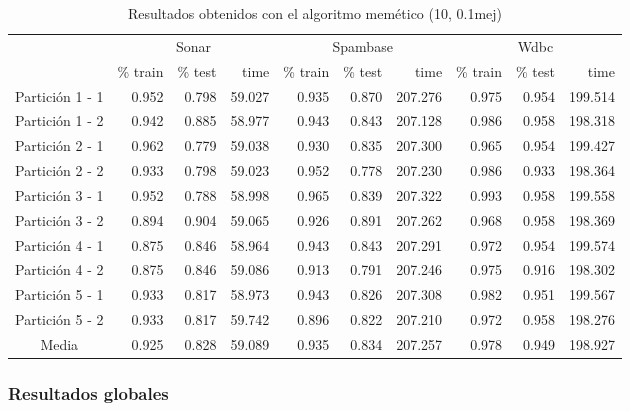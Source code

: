 \documentclass[11pt]{article}
\theoremstyle{plain}
\theoremstyle{definition}
\begin{document}
\begin{table}[H]
\centering
\caption{Resultados obtenidos con el algoritmo memético (10, 0.1mej)}
\label{tbl-amc}
\begin{tabular}{@{}crrrrrrrrr@{}}
  \toprule
  & \multicolumn{3}{c}{Sonar} & \multicolumn{3}{c}{Spambase} & \multicolumn{3}{c}{Wdbc}  \\
  \cmidrule(r){2-10}
           & \% train & \% test & time & \% train   & \% test   & time & \% train & \% test & time \\
  \midrule
Partición 1 - 1   & 0.952 & 0.798 & 59.027 & 0.935 & 0.870 & 207.276 & 0.975 & 0.954 & 199.514 \\
Partición 1 - 2   & 0.942 & 0.885 & 58.977 & 0.943 & 0.843 & 207.128 & 0.986 & 0.958 & 198.318 \\
Partición 2 - 1   & 0.962 & 0.779 & 59.038 & 0.930 & 0.835 & 207.300 & 0.965 & 0.954 & 199.427 \\
Partición 2 - 2   & 0.933 & 0.798 & 59.023 & 0.952 & 0.778 & 207.230 & 0.986 & 0.933 & 198.364 \\
Partición 3 - 1   & 0.952 & 0.788 & 58.998 & 0.965 & 0.839 & 207.322 & 0.993 & 0.958 & 199.558 \\
Partición 3 - 2   & 0.894 & 0.904 & 59.065 & 0.926 & 0.891 & 207.262 & 0.968 & 0.958 & 198.369 \\
Partición 4 - 1   & 0.875 & 0.846 & 58.964 & 0.943 & 0.843 & 207.291 & 0.972 & 0.954 & 199.574 \\
Partición 4 - 2   & 0.875 & 0.846 & 59.086 & 0.913 & 0.791 & 207.246 & 0.975 & 0.916 & 198.302 \\
Partición 5 - 1   & 0.933 & 0.817 & 58.973 & 0.943 & 0.826 & 207.308 & 0.982 & 0.951 & 199.567 \\
Partición 5 - 2   & 0.933 & 0.817 & 59.742 & 0.896 & 0.822 & 207.210 & 0.972 & 0.958 & 198.276 \\
  \bottomrule
Media             & 0.925 & 0.828 & 59.089 & 0.935 & 0.834 & 207.257 & 0.978 & 0.949 & 198.927 \\
\end{tabular}
\end{table}

\subsubsection{Resultados globales}
\end{document}
